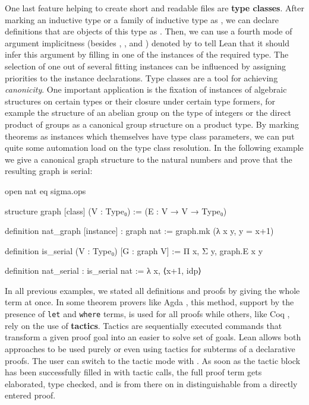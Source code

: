 One last feature helping to create short and readable files are \textbf{type
classes}.
After marking an inductive type or a family of inductive type as \leani{[class]},
we can declare definitions that are objects of this type as \leani{[instance]}.
Then, we can use a fourth mode of argument implicitness (besides ,
, and ) denoted by \leani{[...]} to tell Lean that it
should infer this argument by filling in one of the instances of the required
type.
The selection of one out of several fitting instances can be influenced by assigning
priorities to the instance declarations.
Type classes are a tool for achieving \emph{canonicity}.
One important application is the fixation of instances of algebraic structures on
certain types or their closure under certain type formers, for example the structure
of an abelian group on the type of integers or the direct product of groups as
a canonical group structure on a product type.
By marking theorems as instances which themselves have type class parameters,
we can put quite some automation load on the type class resolution.
In the following example we give a canonical graph structure to the natural numbers
and prove that the resulting graph is serial:
\begin{leancode}
open nat eq sigma.ops

structure graph [class] (V : Type₀) := (E : V → V → Type₀)

definition nat_graph [instance] : graph nat := graph.mk (λ x y, y = x+1)

definition is_serial (V : Type₀) [G : graph V] := Π x, Σ y, graph.E x y

definition nat_serial : is_serial nat := λ x, ⟨x+1, idp⟩
\end{leancode}

In all previous examples, we stated all definitions and proofs by giving the
whole term at once.
In some theorem provers like Agda \cite{agda}, this method, support by the presence
of \texttt{let} and \texttt{where} terms, is used for all proofs while others,
like Coq \cite{coq}, rely on the use of \textbf{tactics}.
Tactics are sequentially executed commands that transform a given proof goal into
an easier to solve set of goals.
Lean allows both approaches to be used purely or even using tactics for subterms
of a declarative proofs.
The user can switch to the tactic mode with .
As soon as the tactic block has been successfully filled in with tactic calls,
the full proof term gets elaborated, type checked, and is from there on in\-
distinguishable from a directly entered proof.

